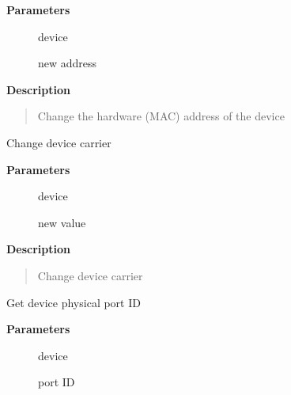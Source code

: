 \documentclass[a4paper,8pt,english]{sphinxmanual}
\begin{document}
\textbf{Parameters}
\begin{description}
\item[{}] \leavevmode
device

\item[{}] \leavevmode
new address

\end{description}

\textbf{Description}
\begin{quote}

Change the hardware (MAC) address of the device
\end{quote}

\begin{fulllineitems}
\label{networking/kapi:c.dev_change_carrier}
Change device carrier

\end{fulllineitems}


\textbf{Parameters}
\begin{description}
\item[{}] \leavevmode
device

\item[{}] \leavevmode
new value

\end{description}

\textbf{Description}
\begin{quote}

Change device carrier
\end{quote}

\begin{fulllineitems}
\label{networking/kapi:c.dev_get_phys_port_id}
Get device physical port ID

\end{fulllineitems}


\textbf{Parameters}
\begin{description}
\item[{}] \leavevmode
device

\item[{}] \leavevmode
port ID

\end{description}
\end{document}

